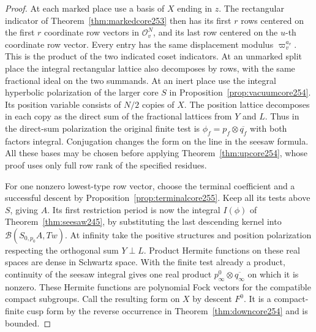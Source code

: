 \documentclass[a4paper,11pt]{article}
\theoremstyle{definition}
\theoremstyle{remark}
\numberwithin{equation}{section}
\begin{document}
\begin{proof}
At each marked place use a basis of \(X\) ending in \(z\).
The rectangular indicator of Theorem~\ref{thm:markedcore253}
then has its first \(r\) rows centered on the first \(r\)
coordinate row vectors in \(\mathcal O_v^N\), and its last
row centered on the \(u\)-th coordinate row vector. Every
entry has the same displacement modulus \(\varpi_v^{a_v}\).
This is the product of the two indicated coset indicators.
At an unmarked split place the integral rectangular lattice
also decomposes by rows, with the same fractional ideal on
the two summands. At an inert place use the integral
hyperbolic polarization of the larger core \(S\) in
Proposition~\ref{prop:vacuumcore254}. Its position variable
consists of \(N/2\) copies of \(X\). The position lattice
decomposes in each copy as the direct sum of the fractional
lattices from \(Y\) and \(L\). Thus in the direct-sum
polarization the original finite test is
\(\phi_f=p_f\otimes\overline{q_f}\) with both factors integral.
Conjugation changes the form on the line in the seesaw formula.
All these bases may be chosen before applying
Theorem~\ref{thm:upcore254}, whose proof uses only full row rank
of the specified residues.

For one nonzero lowest-type row vector, choose the terminal
coefficient and a successful descent by
Proposition~\ref{prop:terminalcore255}. Keep all its tests
above \(S\), giving \(A\). Its first restriction period is now
the integral \(I(\phi)\) of Theorem~\ref{thm:seesaw245}, by
substituting the last descending kernel into
\(\mathcal B(S_{0,p_0} A,Tw)\).
At infinity take the positive structures and position
polarization respecting the orthogonal sum \(Y\perp L\).
Product Hermite functions on these real spaces are dense in
Schwartz space. With the finite test already a product,
continuity of the seesaw integral gives one real product
\(p_\infty^0\otimes\overline{q_\infty}\) on which it is
nonzero. These Hermite functions are polynomial Fock vectors
for the compatible compact subgroups. Call the resulting form
on \(X\) by descent \(F^0\). It is a compact-finite cusp form
by the reverse occurrence in Theorem~\ref{thm:downcore254}
and is bounded.


\end{proof}
\end{document}
